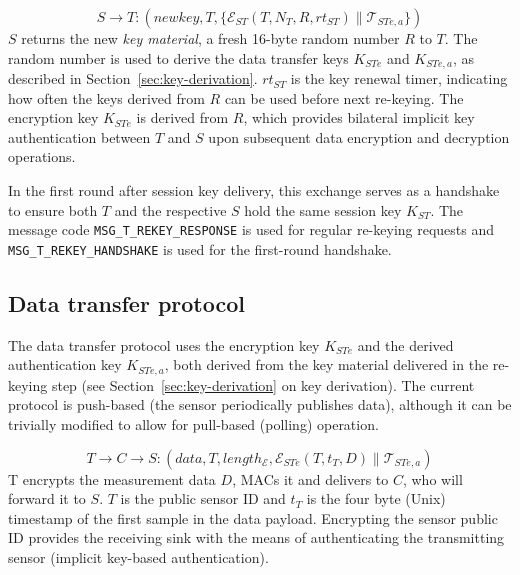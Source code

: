 \[
S \rightarrow T: (\textit{newkey},T, \{ \mathcal{E}_{ST}(T,N_T,R,rt_{ST}) \parallel \mathcal{T}_{STe,a} \} )
\]
%
$S$ returns the new \textit{key material}, a fresh 16-byte random number $R$ to
$T$. The random number is used to derive the data transfer keys $K_{STe}$ and $K_{STe,a}$, as described in Section~\ref{sec:key-derivation}.
$rt_{ST}$ is the key renewal timer, indicating how often the keys derived from $R$ can be used before next re-keying. 
The encryption key $K_{STe}$ is derived from $R$, which provides bilateral implicit key authentication between $T$ and $S$ upon subsequent data encryption and decryption operations.

In the first round after session key delivery, this exchange serves as a handshake to ensure both $T$ and the respective $S$ hold the same session key $K_{ST}$. The message code
\texttt{MSG\_T\_REKEY\_RESPONSE} is used for regular re-keying requests
and \texttt{MSG\_T\_REKEY\_HANDSHAKE} is used for the first-round handshake.

%

\subsection{Data transfer protocol}

The data transfer protocol uses the encryption key $K_{STe}$ and the derived authentication key $K_{STe,a}$, both derived from the key material delivered in the re-keying step (see Section~\ref{sec:key-derivation} on key derivation). The current protocol is push-based (the sensor periodically publishes data), although it can be trivially modified to allow for pull-based (polling) operation.

\[
T \rightarrow C \rightarrow S: (\textit{data},T,length_{\mathcal{E}},\mathcal{E}_{STe}(T,t_T,D) \parallel \mathcal{T}_{STe,a})
\]
%
T encrypts the measurement data $D$, MACs it and delivers to
$C$, who will forward it to $S$. $T$ is the public sensor ID and $t_T$ is the four byte (Unix) timestamp of the first sample in the data payload.
Encrypting the sensor public ID provides the receiving sink with the means of authenticating the transmitting sensor (implicit key-based authentication).
%

